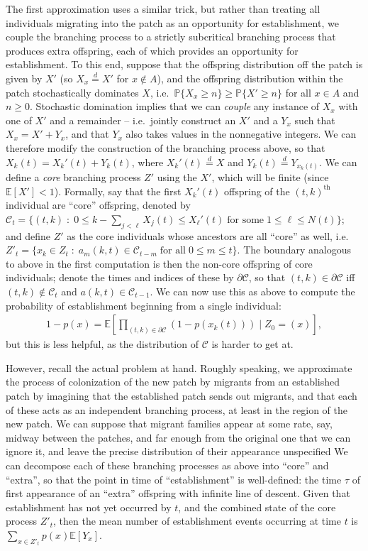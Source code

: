 \documentclass{article}
\renewcommand{\P}{\mathbb{P}}
\newcommand{\E}{\mathbb{E}}
\newcommand{\calC}{\mathcal{C}}
\newcommand{\deq}{\stackrel{\scriptscriptstyle{d}}{=}}
\begin{document}
The first approximation uses a similar trick, but rather than treating all individuals migrating into the patch
as an opportunity for establishment,
we couple the branching process to a strictly subcritical branching process
that produces extra offspring, each of which provides an opportunity for establishment.
To this end, suppose that the offspring distribution off the patch is given by $X'$ (so $X_x \deq X'$ for $x \notin A$),
and the offspring distribution within the patch stochastically dominates $X$,
i.e.\ $\P\{X_x\ge n\} \ge \P\{X'\ge n\}$ for all $x\in A$ and $n \ge 0$.
Stochastic domination implies that we can \emph{couple} any instance of $X_x$ with one of $X'$ and a remainder --
i.e.\ jointly construct an $X'$ and a $Y_x$ such that $X_x = X' + Y_x$,
and that $Y_x$ also takes values in the nonnegative integers.
We can therefore modify the construction of the branching process above,
so that $X_k(t) = X_k'(t) + Y_k(t)$, where $X_k'(t) \deq X$ and $Y_k(t) \deq Y_{x_k(t)}$.
We can define a \emph{core} branching process $Z'$ using the $X'$, which will be finite (since $\E[X']<1$).
Formally, say that the first $X_k'(t)$ offspring of the $(t,k)^\mathrm{th}$ individual are ``core'' offspring,
denoted by $\calC_t = \{ (t,k) \; : \; 0 \le k - \sum_{j<\ell} X_j(t) \le X_\ell'(t) \; \mbox{for some}\; 1 \le \ell \le N(t) \}$;
and define $Z'$ as the core individuals whose ancestors are all ``core'' as well,
i.e.\ $Z'_t = \{ x_k \in Z_t \; : \;  a_m(k,t) \in \calC_{t-m} \; \mbox{for all}\; 0 \le m \le t\}$.
The boundary analogous to above in the first computation is then the non-core offspring of core individuals;
denote the times and indices of these by $\partial \calC$,
so that $(t,k) \in \partial \calC$ iff $(t,k) \notin \calC_t$ and $a(k,t) \in \calC_{t-1}$.
We can now use this as above to compute the probability of establishment beginning from a single individual:
\begin{align}
  1-p(x) = \E\left[ \prod_{(t,k) \in \partial\calC} (1-p(x_k(t))) \; \vert \; Z_0 = (x) \right] ,
\end{align}
but this is less helpful, as the distribution of $\calC$ is harder to get at.

However, recall the actual problem at hand.
Roughly speaking, we approximate the process of colonization of the new patch by migrants from an established patch
by imagining that the established patch sends out migrants, and that each of these acts as an independent branching process,
at least in the region of the new patch.
We can suppose that migrant families appear at some rate, say, midway between the patches, and far enough from the original one that we can ignore it,
and leave the precise distribution of their appearance unspecified
We can decompose each of these branching processes as above into ``core'' and ``extra'',
so that the point in time of ``establishment'' is well-defined:
the time $\tau$ of first appearance of an ``extra'' offspring with infinite line of descent.
Given that establishment has not yet occurred by $t$, 
and the combined state of the core process $Z'_t$,
then the mean number of establishment events occurring at time $t$ is $\sum_{x \in Z'_t} p(x) \E[Y_x]$.
\end{document}
